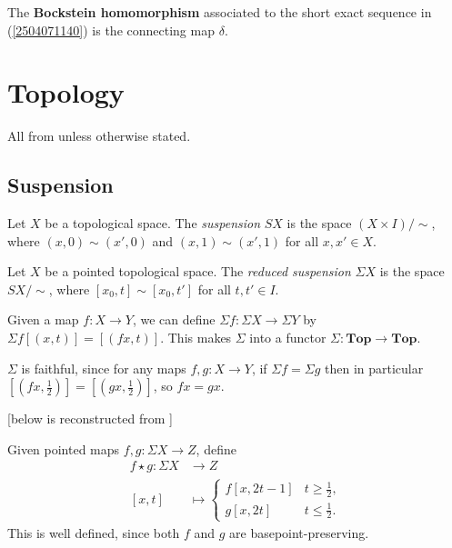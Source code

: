 \documentclass{MetricNotes2023}
\begin{document}
\begin{definition}
The \textbf{Bockstein homomorphism} associated to the short exact sequence in  (\ref{2504071140}) is the connecting map \(\delta\).
\end{definition}

\section{Topology}

All from \autocite{hatcher} unless otherwise stated.

\subsection{Suspension}

\begin{definition}
Let \(X\) be a topological space. The \textit{suspension} \(SX\) is the space \newline\((X\times I)/\sim\), where \((x, 0)\sim (x', 0)\) and \((x,1)\sim (x',1)\) for all \(x,x'\in X\). 
\end{definition}

\begin{definition}
Let \(X\) be a pointed topological space. The \textit{reduced suspension} \(\Sigma X\) is the space \(SX/\sim\), where \([x_0, t]\sim [x_0, t']\) for all \(t,t'\in I\). 
\end{definition}

Given a map \(f : X \to Y\), we can define \(\Sigma f : \Sigma X \to \Sigma Y\) by \(\Sigma f[(x, t)]=[(fx, t)]\). This makes \(\Sigma \) into a functor \(\Sigma : \textbf{Top}\to \textbf{Top}\). 

\begin{remark}\label{2502141442}
\(\Sigma\) is faithful, since for any maps \(f, g : X\to Y\), if \(\Sigma f = \Sigma g\) then in particular \([(fx, \frac{1}{2})]=[(gx, \frac{1}{2})]\), so \(fx=gx\). 
\end{remark}  

[below is reconstructed from  \autocite{mazelgee}]

Given pointed maps \(f, g : \Sigma X \to Z\), define 
\begin{align*}
f \star g : \Sigma X &\to Z\\
[x,t]&\mapsto \begin{cases}
f[x,2t-1] & t \geq \frac{1}{2},\\
g[x,2t] &t\leq \frac{1}{2}.
\end{cases}
\end{align*}
This is well defined, since both \(f\) and \(g\) are basepoint-preserving. %
\end{document}
